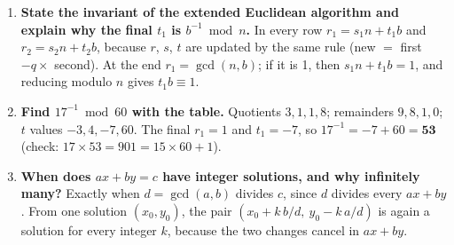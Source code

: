 \begin{enumerate}[leftmargin=1.6em,itemsep=3pt]
  \item \textbf{State the invariant of the extended Euclidean algorithm and explain why the final $t_1$ is $b^{-1} \bmod n$.} In every row $r_1 = s_1 n + t_1 b$ and $r_2 = s_2 n + t_2 b$, because $r$, $s$, $t$ are updated by the same rule (new $=$ first $- q \times$ second). At the end $r_1 = \gcd(n, b)$; if it is 1, then $s_1 n + t_1 b = 1$, and reducing modulo $n$ gives $t_1 b \equiv 1$.
  \item \textbf{Find $17^{-1} \bmod 60$ with the table.} Quotients $3, 1, 1, 8$; remainders $9, 8, 1, 0$; $t$ values $-3, 4, -7, 60$. The final $r_1 = 1$ and $t_1 = -7$, so $17^{-1} = -7 + 60 = \mathbf{53}$ (check: $17 \times 53 = 901 = 15 \times 60 + 1$).
  \item \textbf{When does $ax + by = c$ have integer solutions, and why infinitely many?} Exactly when $d = \gcd(a, b)$ divides $c$, since $d$ divides every $ax + by$. From one solution $(x_0, y_0)$, the pair $(x_0 + k\,b/d,\ y_0 - k\,a/d)$ is again a solution for every integer $k$, because the two changes cancel in $ax + by$.
\end{enumerate}
